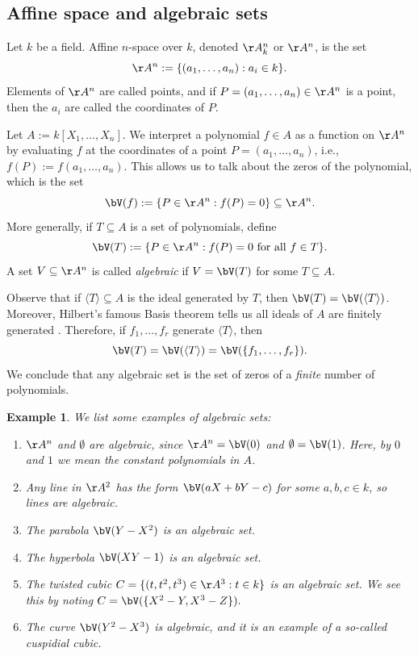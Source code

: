 \documentclass[12pt]{amsart}
\theoremstyle{plain}
\newtheorem{example}[theorem]{Example}
\begin{document}
\subsection{Affine space and algebraic sets}
Let $k$ be a field.
Affine $n$-space over $k$, denoted $\AA^n_k$ or $\AA^n$, is the set 
$$\AA^n := \{(a_1, \ldots, a_n) : a_i \in k\}.$$
Elements of $\AA^n$ are called points, and if $P = (a_1, \ldots, a_n) \in \AA^n$ is a point, then the $a_i$ are called the coordinates of $P$.

Let $A := k[X_1, \ldots, X_n]$.
We interpret a polynomial $f \in A$ as a function on $\AA^n$ by evaluating $f$ at the coordinates of a point $P = (a_1, \ldots, a_n)$, i.e., $f(P) := f(a_1, \ldots, a_n).$
This allows us to talk about the zeros of the polynomial, which is the set
$$\bV(f) := \{P \in \AA^n : f(P) = 0\} \subseteq \AA^n.$$
More generally, if $T \subseteq A$ is a set of polynomials, define
$$\bV(T) := \{P \in \AA^n : f(P) = 0 \text{ for all } f \in T\}.$$
A set $V \subseteq \AA^n$ is called \emph{algebraic} if $V = \bV(T)$ for some $T \subseteq A$.

Observe that if $\langle T \rangle \subseteq A$ is the ideal generated by $T$, then $\bV(T) = \bV(\langle T \rangle)$.
Moreover, Hilbert's famous Basis theorem tells us all ideals of $A$ are finitely generated \cite[\S 3.6]{Reid95}.
Therefore, if $f_1, \ldots, f_r$ generate $\langle T \rangle$, then 
$$\bV(T) = \bV(\langle T \rangle) = \bV(\{f_1, \ldots, f_r\}).$$
We conclude that any algebraic set is the set of zeros of a \emph{finite} number of polynomials.

\begin{example}\label{algsetex}
We list some examples of algebraic sets:
\begin{enumerate}
\item
$\AA^n$ and $\emptyset$ are algebraic, since $\AA^n = \bV(0)$ and $\emptyset = \bV(1)$.
Here, by $0$ and $1$ we mean the constant polynomials in $A$.

\item
Any line in $\AA^2$ has the form $\bV(aX+bY-c)$ for some $a, b, c \in k$, so lines are algebraic.

\item
The parabola $\bV(Y-X^2)$ is an algebraic set.

\item
The hyperbola $\bV(XY - 1)$ is an algebraic set.

\item
The twisted cubic $C = \{(t, t^2, t^3) \in \AA^3 : t \in k\}$ is an algebraic set.
We see this by noting $C = \bV(\{X^2 - Y, X^3 - Z\}).$

\item 
The curve $\bV(Y^2 - X^3)$ is algebraic, and it is an example of a so-called cuspidial cubic.
\end{enumerate}
\end{example}
\end{document}
